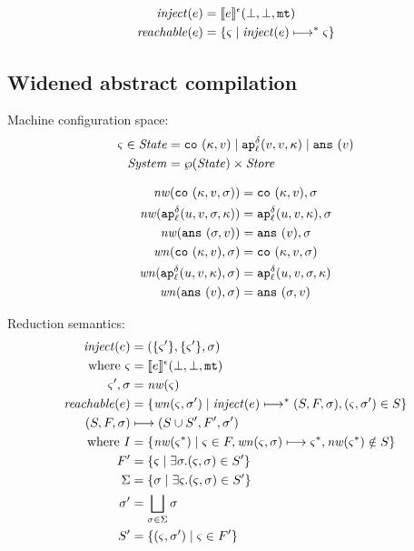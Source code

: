 \documentclass{llncs}
\newcommand{\inject}{\mathit{inject}}
\newcommand{\setof}[1]{\{ #1 \}}
\newcommand{\alt}{\mid}
\begin{document}
\begin{align*}
\inject(\mexp) &= \compile{\mexp}^{\mtcntr}(\bot,\bot,\kmt) \\
\reachable{\mexp} &= \setof{\mstate \mid \inject(\mexp) \machstep^* \mstate}
\end{align*}

\subsection{Widened abstract compilation}

Machine configuration space:
\begin{align*}
\mstate \in \State &= \co{\mkont, \mval} \alt
                     \ap[_\mlab^\mcntr]{\mval,\mval,\mkont} \alt
                     \ans{\mval} \\
\System &= \wp(\State) \times \Store
\end{align*}

\begin{align*}
\nw(\co{\mkont,\mval,\msto}) &= \co{\mkont, \mval}, \msto \\
\nw(\ap[^\mcntr_\mlab]{\mvalx{u},\mval,\msto,\mkont}) &= \ap[^\mcntr_\mlab]{\mvalx{u},\mval,\mkont}, \msto \\
\nw(\ans{\msto,\mval}) &= \ans{\mval}, \msto \\
\wn(\co{\mkont,\mval},\msto) &= \co{\mkont,\mval,\msto} \\
\wn(\ap[^\mcntr_\mlab]{\mvalx{u},\mval,\mkont},\msto) &= \ap[^\mcntr_\mlab]{\mvalx{u},\mval,\msto,\mkont} \\
\wn(\ans{\mval},\msto) &= \ans{\msto,\mval}
\end{align*}

Reduction semantics:
\begin{align*}
\inject(\mexp) &= (\setof{\mstate'},\setof{\mstate'},\msto) \\
 \text{ where } \mstate &= \compile{\mexp}^{\mtcntr}(\bot,\bot,\kmt) \\
                \mstate', \msto &= \nw(\mstate) \\
\reachable{\mexp} &= \setof{\wn(\mstate,\msto') \mid
                             \inject(\mexp) \machstep^* (S,F,\msto),
                             \ttuple{\mstate}{\msto'} \in S} \\
(S,F,\msto) &\machstep (S \cup S', F', \msto') \\
 \text{ where }
  I &= \setof{ \nw(\mstate^*) \mid \mstate \in F, \wn(\mstate,\msto) \machstep \mstate^*, \nw(\mstate^*)\notin S} \\
  F' &= \setof{\mstate \mid \exists \msto. \ttuple{\mstate}{\msto} \in S'} \\
  \Sigma &= \setof{\msto \mid \exists \mstate. \ttuple{\mstate}{\msto} \in S'} \\
  \msto' &= \bigsqcup\limits_{\msto\in\Sigma}{\msto} \\
  S' &= \setof{\ttuple{\mstate}{\msto'} \mid \mstate \in F'}
\end{align*}
\end{document}
